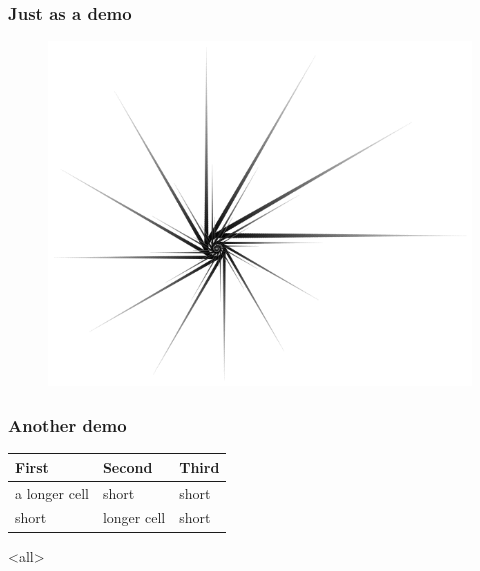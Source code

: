 \begin{frame}

\frametitle{Just as a demo}
\label{justasademo}

\begin{figure}[htbp]
\centering
\includegraphics[keepaspectratio,width=\textwidth,height=0.75\textheight]{Nautilus_Star.png}
\label{}
\end{figure}


\end{frame}

\begin{frame}

\frametitle{Another demo}
\label{anotherdemo}

\begin{table}[htbp]
\begin{minipage}{\linewidth}
\setlength{\tymax}{0.5\linewidth}
\centering
\small
\begin{tabular}{@{}lll@{}} \toprule
First&Second&Third\\
\midrule
a longer cell&short&short\\
short&longer cell&short\\

\bottomrule

\end{tabular}
\end{minipage}
\end{table}


\end{frame}

\mode<all>


\mode*

